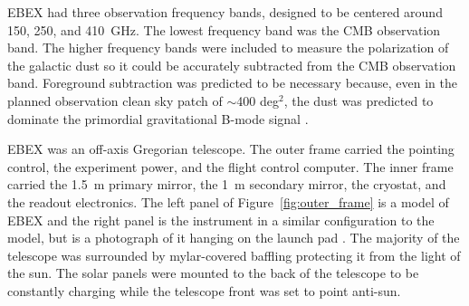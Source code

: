 \ac{EBEX} had three observation frequency bands, designed to be centered around 150, 250, and 410~GHz. 
The lowest frequency band was the \ac{CMB} observation band. 
The higher frequency bands were included to measure the polarization of the galactic dust so it could be accurately subtracted from the \ac{CMB} observation band. 
Foreground subtraction was predicted to be necessary because, even in the planned observation clean sky patch of $\sim$400 deg$^2$, the dust was predicted to dominate the primordial gravitational B-mode signal \cite{Bao2015}. 

\ac{EBEX} was an off-axis Gregorian
 telescope.
The outer frame carried the pointing control, the experiment power, and the flight control computer. 
The inner frame carried the 1.5~m primary mirror, the 1~m secondary mirror, the cryostat, and the readout electronics. 
The left panel of Figure~\ref{fig:outer_frame} is a model of \ac{EBEX} and the right panel is the instrument in a similar configuration to the model, but is a photograph of it hanging on the launch pad \cite{EBEXPaper3}. 
The majority of the telescope was surrounded by mylar-covered baffling protecting it from the light of the sun. 
The solar panels were mounted to the back of the telescope to be constantly charging while the telescope front was set to point anti-sun. 

